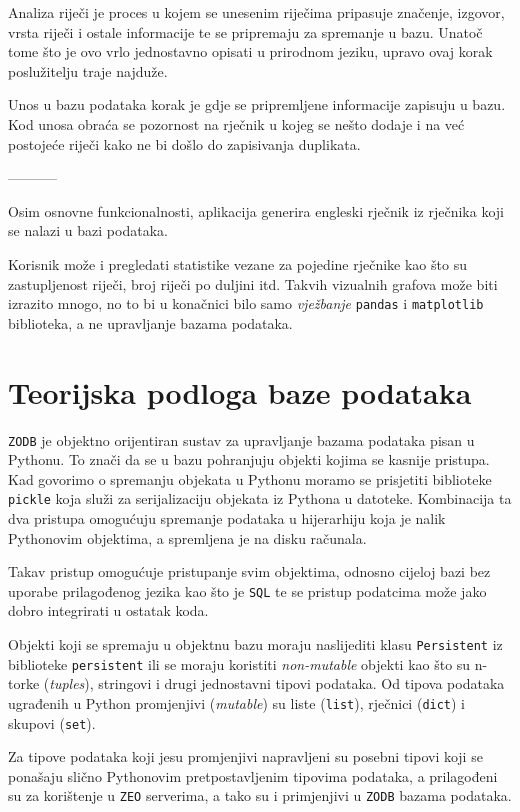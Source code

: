 \documentclass{foi}
\begin{document}
Analiza riječi je proces u kojem se unesenim riječima pripasuje značenje,
izgovor, vrsta riječi i ostale informacije te se pripremaju za spremanje u
bazu. Unatoč tome što je ovo vrlo jednostavno opisati u prirodnom jeziku,
upravo ovaj korak poslužitelju traje najduže.

Unos u bazu podataka korak je gdje se pripremljene informacije zapisuju u bazu.
Kod unosa obraća se pozornost na rječnik u kojeg se nešto dodaje i na već
postojeće riječi kako ne bi došlo do zapisivanja duplikata.

-----------

Osim osnovne funkcionalnosti, aplikacija generira engleski rječnik iz rječnika
koji se nalazi u bazi podataka.

Korisnik može i pregledati statistike vezane za pojedine rječnike kao što su
zastupljenost riječi, broj riječi po duljini itd. Takvih vizualnih grafova može
biti izrazito mnogo, no to bi u konačnici bilo samo \textit{vježbanje}
\texttt{pandas} i \texttt{matplotlib} biblioteka, a ne upravljanje bazama
podataka.

\section{Teorijska podloga baze podataka}

\texttt{ZODB} je objektno orijentiran sustav za upravljanje bazama podataka
pisan u Pythonu. To znači da se u bazu pohranjuju objekti kojima se kasnije
pristupa. Kad govorimo o spremanju objekata u Pythonu moramo se prisjetiti
biblioteke \texttt{pickle} koja služi za serijalizaciju objekata iz Pythona u
datoteke. Kombinacija ta dva pristupa omogućuju spremanje podataka u
hijerarhiju koja je nalik Pythonovim objektima, a spremljena je na disku
računala.

Takav pristup omogućuje pristupanje svim objektima, odnosno cijeloj bazi bez
uporabe prilagođenog jezika kao što je \texttt{SQL} te se pristup podatcima
može jako dobro integrirati u ostatak koda.

Objekti koji se spremaju u objektnu bazu moraju naslijediti klasu
\texttt{Persistent} iz biblioteke \texttt{persistent} ili se moraju koristiti
\textit{non-mutable} objekti kao što su n-torke (\textit{tuples}), stringovi i
drugi jednostavni tipovi podataka. Od tipova podataka ugrađenih u Python
promjenjivi (\textit{mutable}) su liste (\texttt{list}), rječnici
(\texttt{dict}) i skupovi (\texttt{set}).

Za tipove podataka koji jesu promjenjivi napravljeni su posebni tipovi koji se
ponašaju slično Pythonovim pretpostavljenim tipovima podataka, a prilagođeni su
za korištenje u \texttt{ZEO} serverima, a tako su i primjenjivi u \texttt{ZODB}
bazama podataka.
\end{document}
